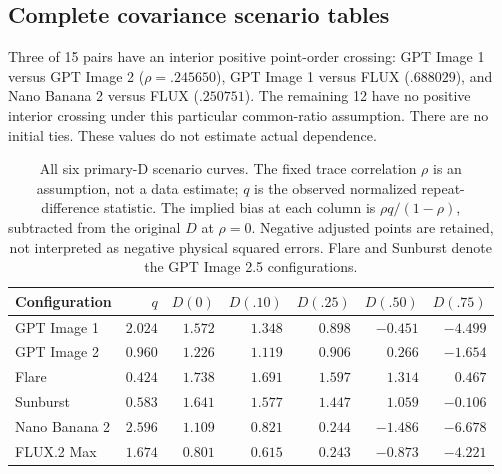 \subsection{Complete covariance scenario tables}
Three of 15 pairs have an interior positive point-order crossing: GPT Image 1 versus GPT Image 2 ($\rho=.245650$), GPT Image 1 versus FLUX ($.688029$), and Nano Banana 2 versus FLUX ($.250751$). The remaining 12 have no positive interior crossing under this particular common-ratio assumption. There are no initial ties. These values do not estimate actual dependence.
\par
\begin{table}[!htbp]
\caption{All six primary-D scenario curves. The fixed trace correlation $\rho$ is an assumption, not a data estimate; $q$ is the observed normalized repeat-difference statistic. The implied bias at each column is $\rho q/(1-\rho)$, subtracted from the original $D$ at $\rho=0$. Negative adjusted points are retained, not interpreted as negative physical squared errors. Flare and Sunburst denote the GPT Image 2.5 configurations.}
\label{tab:covariance-models}
\centering\small\setlength{\tabcolsep}{5pt}
\begin{tabularx}{\linewidth}{@{}Xrrrrrr@{}}\toprule
Configuration & $q$ & $D(0)$ & $D(.10)$ & $D(.25)$ & $D(.50)$ & $D(.75)$\\\midrule
GPT Image 1 & $2.024$ & $1.572$ & $1.348$ & $0.898$ & $-0.451$ & $-4.499$\\
GPT Image 2 & $0.960$ & $1.226$ & $1.119$ & $0.906$ & $0.266$ & $-1.654$\\
Flare & $0.424$ & $1.738$ & $1.691$ & $1.597$ & $1.314$ & $0.467$\\
Sunburst & $0.583$ & $1.641$ & $1.577$ & $1.447$ & $1.059$ & $-0.106$\\
Nano Banana 2 & $2.596$ & $1.109$ & $0.821$ & $0.244$ & $-1.486$ & $-6.678$\\
FLUX.2 Max & $1.674$ & $0.801$ & $0.615$ & $0.243$ & $-0.873$ & $-4.221$\\
\bottomrule\end{tabularx}\end{table}
